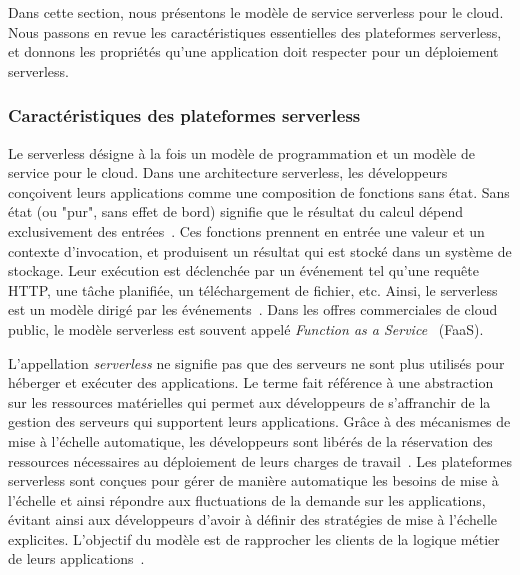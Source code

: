 Dans cette section, nous présentons le modèle de service serverless pour le cloud. Nous passons en revue les caractéristiques essentielles des plateformes serverless, et donnons les propriétés qu'une application doit respecter pour un déploiement serverless.

\subsubsection{Caractéristiques des plateformes serverless}


Le serverless désigne à la fois un modèle de programmation et un modèle de service pour le cloud. Dans une architecture serverless, les développeurs conçoivent leurs applications comme une composition de fonctions sans état. Sans état (ou "pur", sans effet de bord) signifie que le résultat du calcul dépend exclusivement des entrées~\cite{burckhardtNetheriteEfficientExecution}. Ces fonctions prennent en entrée une valeur et un contexte d'invocation, et produisent un résultat qui est stocké dans un système de stockage. Leur exécution est déclenchée par un événement tel qu'une requête \gls{HTTP}, une tâche planifiée, un téléchargement de fichier, etc. Ainsi, le serverless est un modèle dirigé par les événements~\cite{SchleierSmith2021WhatSC}. Dans les offres commerciales de cloud public, le modèle serverless est souvent appelé \textit{Function as a Service}~\cite{hellersteinServerlessComputingOne2019} (\gls{FaaS}).

L'appellation \textit{serverless} ne signifie pas que des serveurs ne sont plus utilisés pour héberger et exécuter des applications. Le terme fait référence à une abstraction sur les ressources matérielles qui permet aux développeurs de s'affranchir de la gestion des serveurs qui supportent leurs applications. Grâce à des mécanismes de mise à l'échelle automatique, les développeurs sont libérés de la réservation des ressources nécessaires au déploiement de leurs charges de travail~\cite{vaneykSPECRGCloud2018}. Les plateformes serverless sont conçues pour gérer de manière automatique les besoins de mise à l'échelle et ainsi répondre aux fluctuations de la demande sur les applications, évitant ainsi aux développeurs d'avoir à définir des stratégies de mise à l'échelle explicites. L'objectif du modèle est de rapprocher les clients de la logique métier de leurs applications~\cite{vaneykSPECRGReferenceArchitecture2019}.

